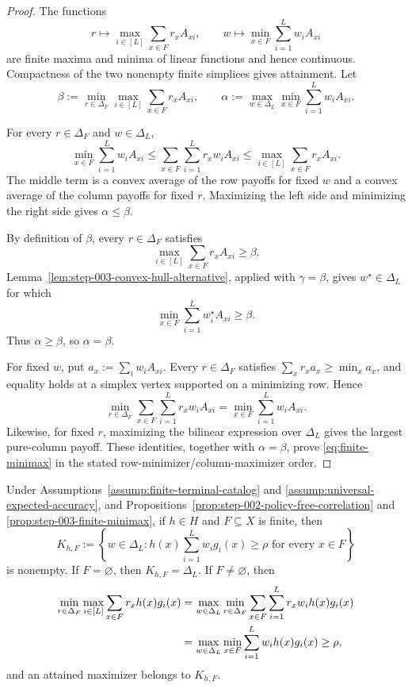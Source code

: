 \begin{proof}
The functions
\[
r\longmapsto\max_{i\in[L]}\sum_{x\in F}r_xA_{xi},
\qquad
w\longmapsto\min_{x\in F}\sum_{i=1}^Lw_iA_{xi}
\]
are finite maxima and minima of linear functions and hence continuous.
Compactness of the two nonempty finite simplices gives attainment.  Let
\[
\beta:=\min_{r\in\Delta_F}\max_{i\in[L]}
\sum_{x\in F}r_xA_{xi},\qquad
\alpha:=\max_{w\in\Delta_L}\min_{x\in F}
\sum_{i=1}^Lw_iA_{xi}.
\]

For every $r\in\Delta_F$ and $w\in\Delta_L$,
\begin{equation}\label{eq:minimax-weak-duality}
\min_{x\in F}\sum_{i=1}^Lw_iA_{xi}
\le\sum_{x\in F}\sum_{i=1}^Lr_xw_iA_{xi}
\le\max_{i\in[L]}\sum_{x\in F}r_xA_{xi}.
\end{equation}
The middle term is a convex average of the row payoffs for fixed $w$ and a
convex average of the column payoffs for fixed $r$.  Maximizing the left side
and minimizing the right side gives $\alpha\le\beta$.

By definition of $\beta$, every $r\in\Delta_F$ satisfies
\[
\max_{i\in[L]}\sum_{x\in F}r_xA_{xi}\ge\beta.
\]
Lemma~\ref{lem:step-003-convex-hull-alternative}, applied with
$\gamma=\beta$, gives $w^\star\in\Delta_L$ for which
\[
\min_{x\in F}\sum_{i=1}^Lw_i^\star A_{xi}\ge\beta.
\]
Thus $\alpha\ge\beta$, so $\alpha=\beta$.

For fixed $w$, put $a_x:=\sum_iw_iA_{xi}$.  Every
$r\in\Delta_F$ satisfies $\sum_xr_xa_x\ge\min_xa_x$, and equality holds at
a simplex vertex supported on a minimizing row.  Hence
\[
\min_{r\in\Delta_F}\sum_{x\in F}\sum_{i=1}^Lr_xw_iA_{xi}
=\min_{x\in F}\sum_{i=1}^Lw_iA_{xi}.
\]
Likewise, for fixed $r$, maximizing the bilinear expression over
$\Delta_L$ gives the largest pure-column payoff.  These identities, together
with $\alpha=\beta$, prove \eqref{eq:finite-minimax} in the stated
row-minimizer/column-maximizer order.
\end{proof}

\begin{proposition}
\label{prop:step-003-finite-feasibility}
Under Assumptions~\ref{assump:finite-terminal-catalog} and
\ref{assump:universal-expected-accuracy}, and
Propositions~\ref{prop:step-002-policy-free-correlation} and
\ref{prop:step-003-finite-minimax}, if $h\in H$ and $F\subseteq X$ is
finite, then
\[
K_{h,F}:=\left\{w\in\Delta_L:
h(x)\sum_{i=1}^Lw_i g_i(x)\ge\rho
\text{ for every }x\in F\right\}
\]
is nonempty.  If $F=\varnothing$, then
$K_{h,F}=\Delta_L$.  If $F\ne\varnothing$, then
\begin{align}
\min_{r\in\Delta_F}\max_{i\in[L]}
\sum_{x\in F}r_xh(x)g_i(x)
&=\max_{w\in\Delta_L}\min_{r\in\Delta_F}
\sum_{x\in F}\sum_{i=1}^Lr_xw_i h(x)g_i(x)\notag\\
&=\max_{w\in\Delta_L}\min_{x\in F}
\sum_{i=1}^Lw_i h(x)g_i(x)
\ge\rho,
\label{eq:catalog-finite-minimax}
\end{align}
and an attained maximizer belongs to $K_{h,F}$.
\end{proposition}

